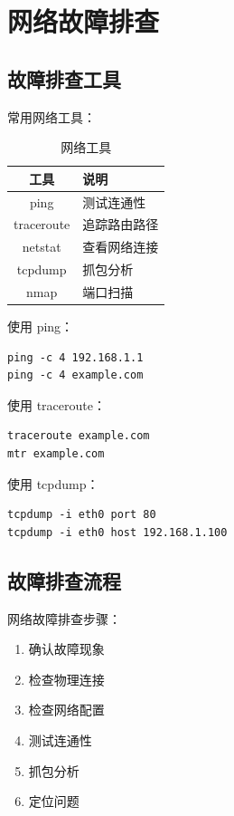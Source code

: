 \documentclass[12pt,UTF8]{ctexbook}
\begin{document}
\chapter{网络故障排查}
\label{chap:troubleshooting}

\section{故障排查工具}
\label{sec:troubleshooting_tools}

常用网络工具：
\begin{table}[htbp]
    \centering
    \caption{网络工具}
    \begin{tabular}{|c|p{8cm}|}
        \hline
        \textbf{工具} & \textbf{说明} \\
        \hline
        ping & 测试连通性 \\
        \hline
        traceroute & 追踪路由路径 \\
        \hline
        netstat & 查看网络连接 \\
        \hline
        tcpdump & 抓包分析 \\
        \hline
        nmap & 端口扫描 \\
        \hline
    \end{tabular}
\end{table}

使用 ping：
\begin{verbatim}
ping -c 4 192.168.1.1
ping -c 4 example.com
\end{verbatim}

使用 traceroute：
\begin{verbatim}
traceroute example.com
mtr example.com
\end{verbatim}

使用 tcpdump：
\begin{verbatim}
tcpdump -i eth0 port 80
tcpdump -i eth0 host 192.168.1.100
\end{verbatim}

\section{故障排查流程}
\label{sec:troubleshooting_flow}

网络故障排查步骤：
\begin{enumerate}
    \item 确认故障现象
    \item 检查物理连接
    \item 检查网络配置
    \item 测试连通性
    \item 抓包分析
    \item 定位问题
\end{enumerate}
\end{document}
